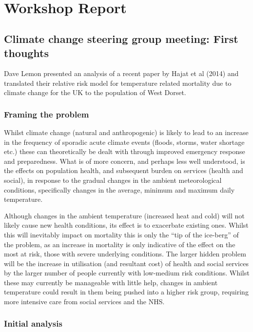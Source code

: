 \chapter[Kick-off Workshop]{Workshop Report}
\section{Climate change steering group meeting: First thoughts}

Dave Lemon presented an analysis of a recent paper by Hajat et al (2014) and translated their relative risk model for temperature related mortality due to climate change for the UK to the population of West Dorset.\cite{Hajat2014}

\subsection{Framing the problem}
Whilst climate change (natural and anthropogenic) is likely to lead to an increase in the frequency of sporadic acute climate events (floods, storms, water shortage etc.) these can theoretically be dealt with through improved emergency response and preparedness. What is of more concern, and perhaps less well understood, is the effects on population health, and subsequent burden on services (health and social), in response to the gradual changes in the ambient meteorological conditions, specifically changes in the average, minimum and maximum daily temperature. 

Although changes in the ambient temperature (increased heat and cold) will not likely cause new health conditions, its effect is to exacerbate existing ones. Whilst this will inevitably impact on mortality this is only the ``tip of the ice-berg'' of the problem, as an increase in mortality is only indicative of the effect on the most at risk, those with severe underlying conditions. The larger hidden problem will be the increase in utilisation (and resultant cost) of health and social services by the larger number of people currently with low-medium risk conditions. Whilst these may currently be manageable with little help, changes in ambient temperature could result in them being pushed into a higher risk group, requiring more intensive care from social services and the NHS.

\subsection{Initial analysis}

